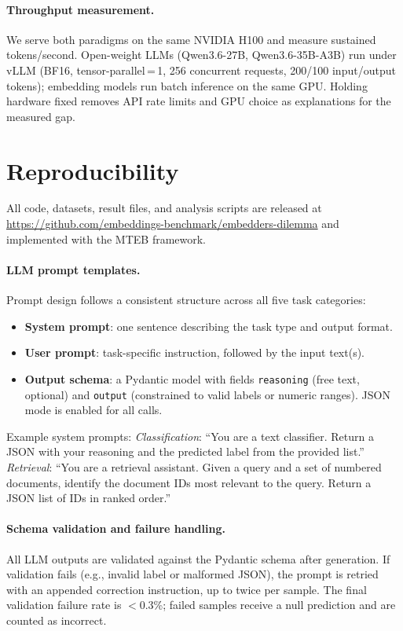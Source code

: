 \paragraph{Throughput measurement.}
We serve both paradigms on the same NVIDIA H100 and measure sustained tokens/second.
Open-weight LLMs (Qwen3.6-27B, Qwen3.6-35B-A3B) run under vLLM (BF16, tensor-parallel\,=\,1, 256 concurrent requests, 200/100 input/output tokens); embedding models run batch inference on the same GPU.
Holding hardware fixed removes API rate limits and GPU choice as explanations for the measured gap.


\section{Reproducibility}
\label{app:reproducibility}

All code, datasets, result files, and analysis scripts are released at \url{https://github.com/embeddings-benchmark/embedders-dilemma} and implemented with the MTEB framework.

\paragraph{LLM prompt templates.}
Prompt design follows a consistent structure across all five task categories:
\begin{itemize}
    \item \textbf{System prompt}: one sentence describing the task type and output format.
    \item \textbf{User prompt}: task-specific instruction, followed by the input text(s).
    \item \textbf{Output schema}: a Pydantic model with fields \texttt{reasoning} (free text, optional) and \texttt{output} (constrained to valid labels or numeric ranges). JSON mode is enabled for all calls.
\end{itemize}
Example system prompts: \emph{Classification}: ``You are a text classifier. Return a JSON with your reasoning and the predicted label from the provided list.'' \emph{Retrieval}: ``You are a retrieval assistant. Given a query and a set of numbered documents, identify the document IDs most relevant to the query. Return a JSON list of IDs in ranked order.''

\paragraph{Schema validation and failure handling.}
All LLM outputs are validated against the Pydantic schema after generation.
If validation fails (e.g., invalid label or malformed JSON), the prompt is retried with an appended correction instruction, up to twice per sample.
The final validation failure rate is $<$0.3\%; failed samples receive a null prediction and are counted as incorrect.

